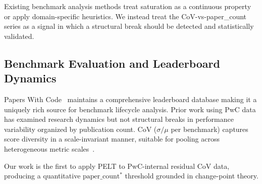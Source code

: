 Existing benchmark analysis methods treat saturation as a continuous property or apply domain-specific heuristics. We instead treat the CoV-vs-paper\_count series as a signal in which a structural break should be detected and statistically validated.

\subsection{Benchmark Evaluation and Leaderboard Dynamics}

Papers With Code~\cite{PwC2019} maintains a comprehensive leaderboard database making it a uniquely rich source for benchmark lifecycle analysis. Prior work using PwC data has examined research dynamics but not structural breaks in performance variability organized by publication count. CoV ($\sigma/\mu$ per benchmark) captures score diversity in a scale-invariant manner, suitable for pooling across heterogeneous metric scales~\cite{Liao2022}.

Our work is the first to apply PELT to PwC-internal residual CoV data, producing a quantitative $\text{paper\_count}^*$ threshold grounded in change-point theory.
